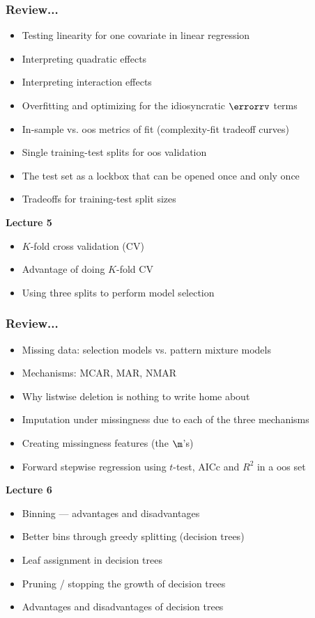 \documentclass[handout]{beamer}
\begin{document}
\begin{frame}\frametitle{Review...}

\begin{itemize}
\item Testing linearity for one covariate in linear regression
\item Interpreting quadratic effects
\item Interpreting interaction effects
\item Overfitting and optimizing for the idiosyncratic $\errorrv$ terms
\item In-sample vs. oos metrics of fit (complexity-fit tradeoff curves)
\item Single training-test splits for oos validation
\item The test set as a lockbox that can be opened once and only once
\item Tradeoffs for training-test split sizes
\end{itemize}
	
\textbf{Lecture 5}

\begin{itemize}
\item $K$-fold cross validation (CV)
\item Advantage of doing $K$-fold CV
\item Using three splits to perform model selection
\end{itemize}
	
\end{frame}

\begin{frame}\frametitle{Review...}

\begin{itemize}
\item Missing data: selection models vs. pattern mixture models
\item Mechanisms: MCAR, MAR, NMAR
\item Why listwise deletion is nothing to write home about
\item Imputation under missingness due to each of the three mechanisms
\item Creating missingness features (the $\m$'s)
\item Forward stepwise regression using $t$-test, AICc and $R^2$ in a oos set
\end{itemize}
	
\textbf{Lecture 6}

\begin{itemize}
\item Binning --- advantages and disadvantages
\item Better bins through greedy splitting (decision trees)
\item Leaf assignment in decision trees
\item Pruning / stopping the growth of decision trees
\item Advantages and disadvantages of decision trees
\end{itemize}
	
\end{frame}
\end{document}
